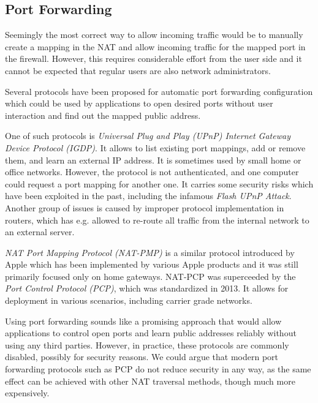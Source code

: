 \subsection{Port Forwarding}

Seemingly the most correct way to allow incoming traffic would be to manually create a mapping in the NAT and allow incoming traffic for the mapped port in the firewall. However, this requires considerable effort from the user side and it cannot be expected that regular users are also network administrators.

Several protocols have been proposed for automatic port forwarding configuration which could be used by applications to open desired ports without user interaction and find out the mapped public address.

One of such protocols is \textit{Universal Plug and Play (UPnP) Internet Gateway Device Protocol (IGDP)}. It allows to list existing port mappings, add or remove them, and learn an external IP address. It is sometimes used by small home or office networks. However, the protocol is not authenticated, and one computer could request a port mapping for another one. It carries some security risks which have been exploited in the past, including the infamous \textit{Flash UPnP Attack}. Another group of issues is caused by improper protocol implementation in routers, which has e.g. allowed to re-route all traffic from the internal network to an external server. \cite{upnpbugs}

\textit{NAT Port Mapping Protocol (NAT-PMP)} is a similar protocol introduced by Apple which has been implemented by various Apple products and it was still primarily focused only on home gateways. NAT-PCP was superceeded by the \textit{Port Control Protocol (PCP)}, which was standardized in 2013. \cite{pcp} It allows for deployment in various scenarios, including carrier grade networks.

Using port forwarding sounds like a promising approach that would allow applications to control open ports and learn public addresses reliably without using any third parties. However, in practice, these protocols are commonly disabled, possibly for security reasons. We could argue that modern port forwarding protocols such as PCP do not reduce security in any way, as the same effect can be achieved with other NAT traversal methods, though much more expensively.



